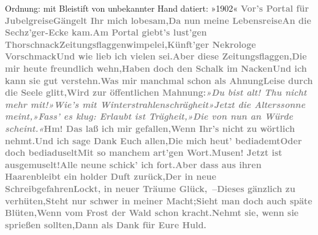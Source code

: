 \begin{ledgroupsized}[t]{13cm}
{\newline{}Ordnung: mit Bleistift von unbekannter Hand datiert: »1902« }\toendnotes[C]{\smallbreak}\stanza{}{\pb}\textcolor{gray}{\textbf{Vor’s Portal für Jubelgreise}}\newverse{}\textcolor{gray}{\textbf{Gängelt Ihr mich lobesam,}}\newverse{}\textcolor{gray}{\textbf{Da nun meine Lebensreise}}\newverse{}\textcolor{gray}{\textbf{An die Sechz’ger-Ecke kam.}}\stanzaend{}\stanza{}\textcolor{gray}{\textbf{Am Portal giebt’s lust’gen Thorschnack}}\newverse{}\textcolor{gray}{\textbf{Zeitungsflaggenwimpelei,}}\newverse{}\textcolor{gray}{\textbf{Künft’ger Nekrologe Vorschmack}}\newverse{}\textcolor{gray}{\textbf{Und wie lieb ich vielen sei.}}\stanzaend{}\stanza{}\textcolor{gray}{\textbf{Aber diese Zeitungsflaggen,}}\newverse{}\textcolor{gray}{\textbf{Die mir heute freundlich wehn,}}\newverse{}\textcolor{gray}{\textbf{Haben doch den Schalk im Nacken}}\newverse{}\textcolor{gray}{\textbf{Und ich kann sie gut verstehn.}}\stanzaend{}\stanza{}\textcolor{gray}{\textbf{Was mir manchmal schon als Ahnung}}\newverse{}\textcolor{gray}{\textbf{Leise durch die Seele glitt,}}\newverse{}\textcolor{gray}{\textbf{Wird zur öffentlichen Mahnung:}}\newverse{}\textcolor{gray}{\textbf{\emph{»Du bist alt! Thu nicht mehr mit!}}}\stanzaend{}\stanza{}\textcolor{gray}{\textbf{\emph{»Wie’s mit Winterstrahlenschrägheit}}}\newverse{}\textcolor{gray}{\textbf{\emph{»Jetzt die Alterssonne meint,}}}\newverse{}\textcolor{gray}{\textbf{\emph{»Fass’ es klug: Erlaubt ist Trägheit,}}}\newverse{}\textcolor{gray}{\textbf{\emph{»Die von nun an Würde scheint.«}}}\stanzaend{}\stanza{}{\pb}\textcolor{gray}{\textbf{Hm! Das laß ich mir gefallen,}}\newverse{}\textcolor{gray}{\textbf{Wenn Ihr’s nicht zu wörtlich nehmt.}}\newverse{}\textcolor{gray}{\textbf{Und ich sage Dank Euch allen,}}\newverse{}\textcolor{gray}{\textbf{Die mich heut’ bediademt}}\stanzaend{}\stanza{}\textcolor{gray}{\textbf{Oder doch bediaduselt}}\newverse{}\textcolor{gray}{\textbf{Mit so manchem art’gen Wort.}}\newverse{}\textcolor{gray}{\textbf{Musen! Jetzt ist ausgemuselt!}}\newverse{}\textcolor{gray}{\textbf{Alle neune schick’ ich fort.}}\stanzaend{}\stanza{}\textcolor{gray}{\textbf{Aber dass aus ihren Haaren}}\newverse{}\textcolor{gray}{\textbf{bleibt ein holder Duft zurück,}}\newverse{}\textcolor{gray}{\textbf{Der in neue Schreibgefahren}}\newverse{}\textcolor{gray}{\textbf{Lockt, in neuer Träume Glück, –}}\stanzaend{}\stanza{}\textcolor{gray}{\textbf{Dieses gänzlich zu verhüten,}}\newverse{}\textcolor{gray}{\textbf{Steht nur schwer in meiner Macht;}}\newverse{}\textcolor{gray}{\textbf{Sieht man doch auch späte Blüten,}}\newverse{}\textcolor{gray}{\textbf{Wenn vom Frost der Wald schon kracht.}}\stanzaend{}\stanza{}\textcolor{gray}{\textbf{Nehmt sie, wenn sie sprießen sollten,}}\newverse{}\textcolor{gray}{\textbf{Dann als Dank für Eure Huld.}}\newverse{}\textcolor{gray}{\textbf{}}\newverse{}\textcolor{gray}{\textbf{}}\stanzaend{}\pstart

\end{ledgroupsized}
